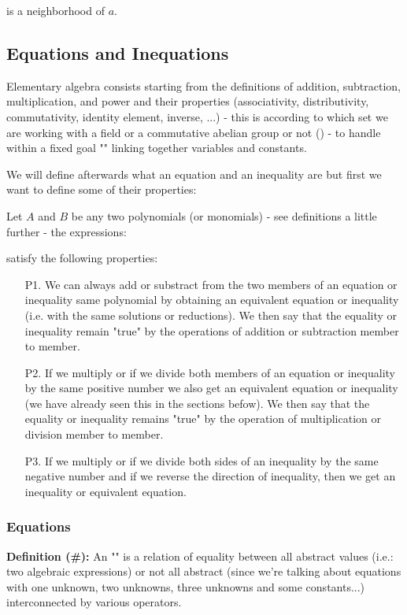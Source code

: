 is a neighborhood of $a$.

\subsection{Equations and Inequations}

Elementary algebra consists starting from the definitions of addition, subtraction, multiplication, and power and their properties (associativity, distributivity, commutativity, identity element, inverse, ...) - this is according to which set we are working with a field or a commutative abelian group or not () - to handle within a fixed goal "" linking together variables and constants.

We will define afterwards what an equation and an inequality are but first we want to define some of their properties:

Let $A$ and $B$ be any two polynomials (or monomials)  - see definitions a little further - the expressions:
	
satisfy the following properties:
	\begin{enumerate}
		\item[P1.] We can always add or substract from the two members of an equation or inequality same polynomial by obtaining an equivalent equation or inequality (i.e. with the same solutions or reductions). We then say that the equality or inequality remain "true" by the operations of addition or subtraction member to member.
		\item[P2.] If we multiply or if we divide both members of an equation or inequality by the same positive number we also get an equivalent equation or inequality (we have already seen this in the sections befow). We then say that the equality or inequality remains "true" by the operation of multiplication or division member to member.
		\item[P3.] If we multiply or if we divide both sides of an inequality by the same negative number and if we reverse the direction of inequality, then we get an inequality or equivalent equation.
	\end{enumerate}
	
	\subsubsection{Equations}
	\textbf{Definition (\#\mydef):} An "" is a relation of equality between all abstract values (i.e.: two algebraic expressions) or not all abstract (since we're talking about equations with one unknown, two unknowns, three unknowns and some constants...) interconnected by various operators.

